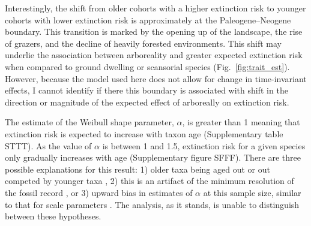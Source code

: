 \documentclass[12pt]{article}
\begin{document}
Interestingly, the shift from older cohorts with a higher extinction risk to younger cohorts with lower extinction risk is approximately at the Paleogene--Neogene boundary. This transition is marked by the opening up of the landscape, the rise of grazers, and the decline of heavily forested environments. This shift may underlie the association between arboreality and greater expected extinction risk when compared to ground dwelling or scansorial species (Fig.~\ref{fig:trait_est}). However, because the model used here does not allow for change in time-invariant effects, I cannot identify if there this boundary is associated with shift in the direction or magnitude of the expected effect of arboreally on extinction risk.

The estimate of the Weibull shape parameter, $\alpha$, is greater than 1 meaning that extinction risk is expected to increase with taxon age (Supplementary table STTT). As the value of $\alpha$ is between 1 and 1.5, extinction risk for a given species only gradually increases with age (Supplementary figure SFFF). There are three possible explanations for this result: 1) older taxa being aged out or out competed by younger taxa \cite{Wagner2014b}, 2) this is an artifact of the minimum resolution of the fossil record \cite{Sepkoski1975}, or 3) upward bias in estimates of $\alpha$ at this sample size, similar to that for scale parameters \cite{Gelman2013d}. The analysis, as it stands, is unable to distinguish between these hypotheses.

\end{document}
